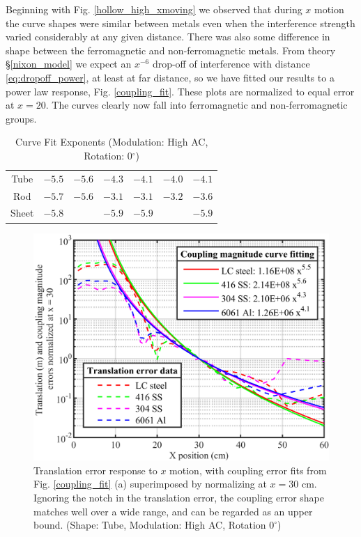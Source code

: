 \documentclass[journal,twoside,web]{ieeecolor}
\begin{document}
Beginning with Fig. \ref{hollow_high_xmoving} we observed that during $x$ motion the curve shapes were similar between metals even when the interference strength varied considerably at any given distance. There was also some difference in shape between the ferromagnetic and non-ferromagnetic metals. From theory \S\ref{nixon_model} we expect an $x^{-6}$ drop-off of interference with distance \eqref{eq:dropoff_power}, at least at far distance, so we have fitted our results to a power law response, Fig. \ref{coupling_fit}. These plots are normalized to equal error at $x=20$. The curves clearly now fall into ferromagnetic and non-ferromagnetic groups.

\begin{table}[!b]
\caption{Curve Fit Exponents (Modulation: High AC, Rotation: 0$^\circ$)}
\label{exponent}
\setlength{\tabcolsep}{3pt}
\centering
\begin{tabular}{|c|c|c|c|c|c|c|}
\hline
\parbox{45pt}{} & 
\parbox{30pt}{} & 
\parbox{30pt}{} & 
\parbox{30pt}{} &
\parbox{30pt}{} &
\parbox{20pt}{} &
\parbox{20pt}{} \\
\hline

Tube& $-5.5$& $-5.6$&$-4.3$&$-4.1$&$-4.0$&$-4.1$\\
Rod& $-5.7$& $-5.6$&$-3.1$&$-3.1$&$-3.2$&$-3.6$\\
Sheet& $-5.8$&$ $&$-5.9$&$-5.9$&$ $&$-5.9$\\

\hline
\end{tabular}
\end{table}

\begin{figure}[!b]
\centerline{\includegraphics[width=\columnwidth]{chaic17.png}}
\caption{Translation error response to $x$ motion, with coupling error fits from Fig. \ref{coupling_fit} (a) superimposed by normalizing at $x = 30$ cm. Ignoring the notch in the translation error, the coupling error shape matches well over a wide range, and can be regarded as an upper bound.
(Shape: Tube, Modulation: High AC, Rotation $0^\circ$)}
\label{coup_trans_fit}
\end{figure}
\end{document}
